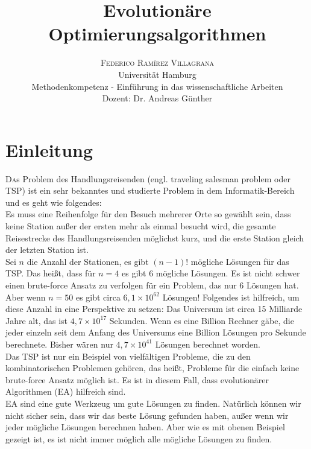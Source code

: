 \documentclass[twoside,twocolumn]{article}
\title{Evolutionäre Optimierungsalgorithmen} %
\author{
	\textsc{Federico Ramírez Villagrana} \\[1ex]
	\normalsize Universität Hamburg \\
	\normalsize Methodenkompetenz - Einführung in das wissenschaftliche Arbeiten \\
	\normalsize Dozent: Dr. Andreas Günther
}
\date{} %
\newcommand{\e}[1]{\times 10^{#1}}
\begin{document}
\maketitle


\section{Einleitung}

\lettrine[nindent=0em,lines=3]{D} as Problem des Handlungsreisenden (engl. traveling salesman problem oder TSP) ist ein sehr bekanntes und studierte Problem in dem Informatik-Bereich und es geht wie folgendes:\\
Es muss eine Reihenfolge für den Besuch mehrerer Orte so gewählt sein, dass keine Station außer der ersten mehr als einmal besucht wird, die gesamte Reisestrecke des Handlungsreisenden möglichst kurz, und die erste Station gleich der letzten Station ist. \cite{wiki_tsp}\\
Sei $n$ die Anzahl der Stationen, es gibt $(n-1)!$ mögliche Lösungen für das TSP. Das heißt, dass für $n=4$ es gibt $6$ mögliche Lösungen. Es ist nicht schwer einen brute-force Ansatz zu verfolgen für ein Problem, das nur 6 Lösungen hat. Aber wenn $n=50$ es gibt circa $6,1\e{62}$ Lösungen! Folgendes ist hilfreich, um diese Anzahl in eine Perspektive zu setzen: Das Universum ist circa 15 Milliarde Jahre alt, das ist $4,7\e{17}$ Sekunden. Wenn es eine Billion Rechner gäbe, die jeder einzeln seit dem Anfang des Universums eine Billion Lösungen pro Sekunde berechnete. Bisher wären nur $4,7\e{41}$ Lösungen berechnet worden.\\
Das TSP ist nur ein Beispiel von vielfältigen Probleme, die zu den kombinatorischen Problemen gehören, das heißt, Probleme für die einfach keine brute-force Ansatz möglich ist. Es ist in diesem Fall, dass evolutionärer Algorithmen (EA) hilfreich sind.\\
EA sind eine gute Werkzeug um gute Lösungen zu finden. Natürlich können wir nicht sicher sein, dass wir das beste Lösung gefunden haben, außer wenn wir jeder mögliche Lösungen berechnen haben. Aber wie es mit obenen Beispiel gezeigt ist, es ist nicht immer möglich alle mögliche Lösungen zu finden.

\end{document}

